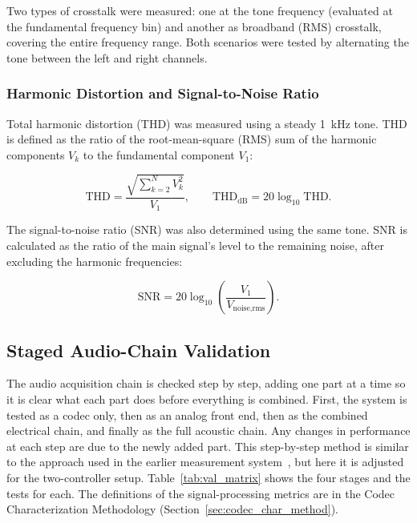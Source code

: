 Two types of crosstalk were measured: one at the tone frequency (evaluated at the fundamental frequency bin) and another as broadband (RMS) crosstalk, covering the entire frequency range. Both scenarios were tested by alternating the tone between the left and right channels.

\subsubsection{Harmonic Distortion and Signal-to-Noise Ratio}
\label{sec:char_thd}
Total harmonic distortion (THD) was measured using a steady \SI{1}{\kilo\hertz} tone. THD is defined as the ratio of the root-mean-square (RMS) sum of the harmonic components $V_k$ to the fundamental component $V_1$:

\begin{equation}
\mathrm{THD} = \frac{\sqrt{\sum_{k=2}^{N} V_k^2}}{V_1}, \qquad \mathrm{THD_{dB}} = 20\log_{10}\mathrm{THD}.
\label{eq:thd}
\end{equation}

The signal-to-noise ratio (SNR) was also determined using the same tone. SNR is calculated as the ratio of the main signal’s level to the remaining noise, after excluding the harmonic frequencies:

\begin{equation}
\mathrm{SNR} = 20\log_{10}\!\left( \frac{V_1}{V_{\text{noise,rms}}} \right).
\label{eq:snr}
\end{equation}


\subsection{Staged Audio-Chain Validation}
\label{sec:staged_validation}

The audio acquisition chain is checked step by step, adding one part at a time so it is clear what each part does before everything is combined. First, the system is tested as a codec only, then as an analog front end, then as the combined electrical chain, and finally as the full acoustic chain. Any changes in performance at each step are due to the newly added part. This step-by-step method is similar to the approach used in the earlier measurement system~\cite{IRThesisAndres}, but here it is adjusted for the two-controller setup. Table~\ref{tab:val_matrix} shows the four stages and the tests for each. The definitions of the signal-processing metrics are in the Codec Characterization Methodology (Section~\ref{sec:codec_char_method}).

